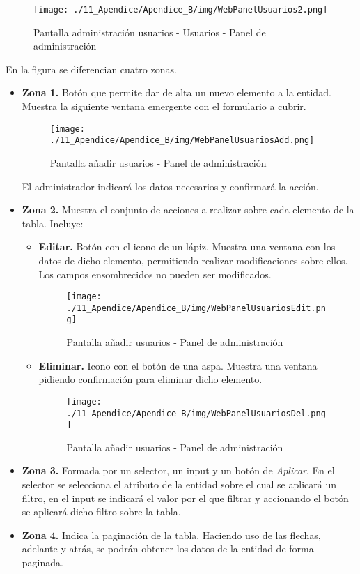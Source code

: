 \begin{figure}[H]
\centering
\texttt{[image: ./11\_Apendice/Apendice\_B/img/WebPanelUsuarios2.png]}
\caption{Pantalla administración usuarios - Usuarios - Panel de administración}
\end{figure}

En la figura se diferencian cuatro zonas.


\begin{itemize}
	
	\item \textbf{Zona 1. }Botón que permite dar de alta un nuevo elemento a la entidad. Muestra la siguiente ventana emergente con el formulario a cubrir.
	
\begin{figure}[H]
\centering
\texttt{[image: ./11\_Apendice/Apendice\_B/img/WebPanelUsuariosAdd.png]}
\caption{Pantalla añadir usuarios - Panel de administración}
\end{figure}

El administrador indicará los datos necesarios y confirmará la acción.
	
	\item \textbf{Zona 2. }Muestra el conjunto de acciones a realizar sobre cada elemento de la tabla. Incluye:
	\begin{itemize}
		\item \textbf{Editar. }Botón con el icono de un lápiz. Muestra una ventana con los datos de dicho elemento, permitiendo realizar modificaciones sobre ellos. Los campos ensombrecidos no pueden ser modificados.
		
		\begin{figure}[H]
		\centering
		\texttt{[image: ./11\_Apendice/Apendice\_B/img/WebPanelUsuariosEdit.png]}
		\caption{Pantalla añadir usuarios - Panel de administración}
		\end{figure}
		
		\item \textbf{Eliminar. }Icono con el botón de una aspa. Muestra una ventana pidiendo confirmación para eliminar dicho elemento.
		\begin{figure}[H]
		\centering
		\texttt{[image: ./11\_Apendice/Apendice\_B/img/WebPanelUsuariosDel.png]}
		\caption{Pantalla añadir usuarios - Panel de administración}
		\end{figure}
	\end{itemize}		
	
	\item \textbf{Zona 3. }Formada por un selector, un input y un botón de \textit{Aplicar}. En el selector se selecciona el atributo de la entidad sobre el cual se aplicará un filtro, en el input se indicará el valor por el que filtrar y accionando el botón se aplicará dicho filtro sobre la tabla.
	
	\item \textbf{Zona 4. }Indica la paginación de la tabla. Haciendo uso de las flechas, adelante y atrás, se podrán obtener los datos de la entidad de forma paginada.
\end{itemize}


